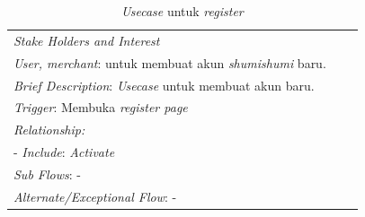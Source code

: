\documentclass[a4paper]{article}
\begin{document}
\begin{enumerate}
\begin{enumerate}
\begin{table}[h]
\begin{tabular}{|lll}
            \multicolumn{1}{|l|}{\textit{Stake Holders and Interest}} &                               &                               \\ \cline{1-1}
            \multicolumn{1}{|l|}{\textit{User, merchant}: untuk membuat akun \textit{shumishumi} baru. }                                                     &                               &                               \\ \hline
            \multicolumn{3}{|l|}{\textit{Brief Description}: \textit{Usecase} untuk membuat akun baru.}                                                                         \\ \hline
            \multicolumn{3}{|l|}{\textit{Trigger}: Membuka\textit{ register page}}                                                                                   \\ \hline
            \multicolumn{3}{|l|}{\textit{Relationship:}}                                                                              \\ \hline
            \multicolumn{3}{|l|}{- \textit{Include}: \textit{Activate}}                                                                                                                     \\ \hline
            \multicolumn{3}{|l|}{\textit{Sub Flows}: -}                                                                                 \\ \hline
            \multicolumn{3}{|l|}{\textit{Alternate/Exceptional Flow}: -}                                                                \\ \hline
            \end{tabular}
            \caption{\textit{Usecase} untuk \textit{register}}
        \end{table}


\end{enumerate}
\end{enumerate}
\end{document}
